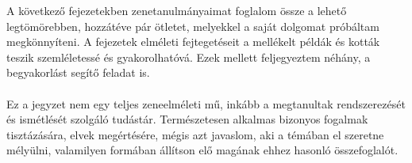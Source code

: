 A következő fejezetekben zenetanulmányaimat foglalom össze a lehető legtömörebben, hozzátéve pár ötletet, melyekkel a saját dolgomat próbáltam megkönnyíteni. A fejezetek elméleti fejtegetéseit a mellékelt példák és kották teszik szemléletessé és gyakorolhatóvá. Ezek mellett feljegyeztem néhány, a begyakorlást segítő feladat is. \\\\
Ez a jegyzet nem egy teljes zeneelméleti mű, inkább a megtanultak rendszerezését és ismétlését szolgáló tudástár. Természetesen alkalmas bizonyos fogalmak tisztázására, elvek megértésére, mégis azt javaslom, aki a témában el szeretne mélyülni, valamilyen formában állítson elő magának ehhez hasonló összefoglalót.
